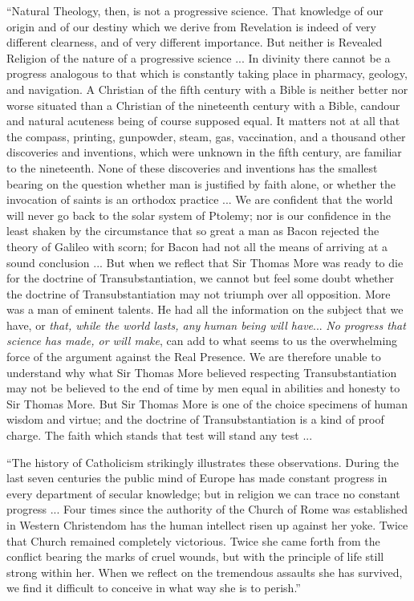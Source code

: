 ``Natural Theology, then, is not a progressive science. That
knowledge of our origin and of our destiny which we derive from
Revelation is indeed of very different clearness, and of very
different importance. But neither is Revealed Religion of the nature
of a progressive science ... In divinity there cannot be a progress
analogous to that which is constantly taking place in pharmacy,
geology, and navigation. A Christian of the fifth century with a Bible
is neither better nor worse situated than a Christian of the
nineteenth century with a Bible, candour and natural acuteness being
of course supposed equal. It matters not at all that the compass,
printing, gunpowder, steam, gas, vaccination, and a thousand other
discoveries and inventions, which were unknown in the fifth century,
are familiar to the nineteenth. None of these discoveries and
inventions has the smallest bearing on the question whether man is
justified by faith alone, or whether the invocation of saints is an
orthodox practice ... We are confident that the world will never go
back to the solar system of Ptolemy; nor is our confidence in the
least shaken by the circumstance that so great a man as Bacon rejected
the theory of Galileo with scorn; for Bacon had not all the means of
arriving at a sound conclusion ... But when we reflect that Sir Thomas
More was ready to die for the doctrine of Transubstantiation, we
cannot but feel some doubt whether the doctrine of Transubstantiation
may not triumph over all opposition. More was a man of eminent
talents. He had all the information on the subject that we have, or \emph{that,
while the world lasts, any} \emph{human being will have}... \emph{No
progress that science has made, or will make}, can add to what
seems to us the overwhelming force of the argument against the Real
Presence. We are therefore unable to understand why what Sir Thomas
More believed respecting Transubstantiation may not be believed to the
end of time by men equal in abilities and honesty to Sir Thomas More.
But Sir Thomas More is one of the choice specimens of human wisdom and
virtue; and the doctrine of Transubstantiation is a kind of proof
charge. The faith which stands that test will stand any test ...

``The history of Catholicism strikingly illustrates these
observations. During the last seven centuries the public mind of
Europe has made constant progress in every department of secular
knowledge; but in religion we can trace no constant progress ... Four
times since the authority of the Church of Rome was established in
Western Christendom has the human intellect risen up against her yoke.
Twice that Church remained completely victorious. Twice she came forth
from the conflict bearing the marks of cruel wounds, but with the
principle of life still strong within her. When we reflect on the
tremendous assaults she has survived, we find it difficult to conceive
in what way she is to perish.''

